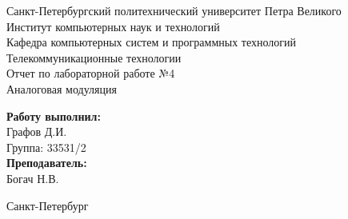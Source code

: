 \begin{titlepage}	%

	\begin{center}		%

		\large Санкт-Петербургский политехнический университет Петра Великого\\
		\large Институт компьютерных наук и технологий \\
		\large Кафедра компьютерных систем и программных технологий\\[6cm]
		
		\huge Телекоммуникационные технологии\\[0.5cm] %
		\large Отчет по лабораторной работе №4\\[0.1cm]
		\large Аналоговая модуляция\\[5cm]

	\end{center}


	\begin{flushright} %
		\begin{minipage}{0.25\textwidth} %
			\begin{flushleft} %

				\large\textbf{Работу выполнил:}\\
				\large Графов Д.И.\\
				\large {Группа:} 33531/2\\
				
				\large \textbf{Преподаватель:}\\
				\large Богач Н.В.

			\end{flushleft}
		\end{minipage}
	\end{flushright}
	
	\vfill %

	\begin{center}
	\large Санкт-Петербург\\
	\large \the\year %
	\end{center} %

\thispagestyle{empty} %
\end{titlepage} %

\vfill %
